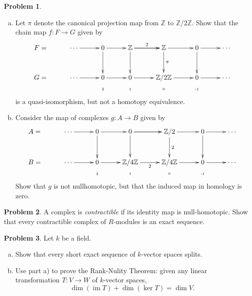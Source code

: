 \documentclass[11pt]{article}
\DeclareMathOperator{\im}{im}
\newcommand{\Z}{\mathbb{Z}}
\theoremstyle{definition}
\newtheorem{problem}{Problem}
\begin{document}
\begin{problem}$\,$
\begin{enumerate}[a)]
	\item Let $\pi$ denote the canonical projection map from $\Z$ to $\Z/2\Z$. Show that the chain map $f\!: F \longrightarrow G$ given by
$$\xymatrix@R=1mm@C=10mm{F = & \cdots \ar[r] & 0 \ar[r] \ar[dddd] & \Z \ar[r]^-2 \ar[dddd] \ar[r] & \Z \ar[dddd]^-{\pi} \ar[r] & 0 \ar[dddd] \ar[r] & \cdots \\
	&&&&\\ 
	&&&&\\ 
	&&&&\\ 
	G = &\cdots \ar[r] & 0 \ar[r] & 0 \ar[r] & \Z/2\Z \ar[r] & 0 \ar[r] & \cdots \\
	&& \textrm{\tiny 2} & \textrm{\tiny 1} & \textrm{\tiny 0} &\textrm{\tiny -1}}$$
is a quasi-isomorphism, but not a homotopy equivalence.
	
\item Consider the map of complexes $g\!: A \to B$ given by
$$\xymatrix@R=1mm@C=10mm{A = & \cdots \ar[r] & 0 \ar[r] \ar[dddd] & 0 \ar[r] \ar[dddd] \ar[r] & \Z/2 \ar[dddd]^-{2} \ar[r] & 0 \ar[dddd] \ar[r] & \cdots \\ 
	&&&&\\ 
	&&&&\\ 
	&&&&\\ 
	B = & \cdots \ar[r] & 0 \ar[r] & \Z/4\Z \ar[r]_-2 & \Z/4\Z \ar[r] & 0 \ar[r] & \cdots \\
	&& \textrm{\tiny 2} & \textrm{\tiny 1} & \textrm{\tiny 0} &\textrm{\tiny -1}}$$
Show that $g$ is not nullhomotopic, but that the induced map in homology is zero.
\end{enumerate}
\end{problem}

\vfill

\begin{problem}
	A complex is \emph{contractible} if its identity map is null-homotopic. Show that every contractible complex of $R$-modules is an exact sequence.
\end{problem}

\newpage

\begin{problem}
	Let $k$ be a field. 
\begin{enumerate}[a)]
	\item Show that every short exact sequence of $k$-vector spaces splits.	
	\item Use part a) to prove the Rank-Nulity Theorem: given any linear transformation $T\!: V \to W$ of $k$-vector spaces, 
	$$\dim(\im T) + \dim(\ker T) = \dim V.$$
\end{enumerate}
\end{problem}
\end{document}

